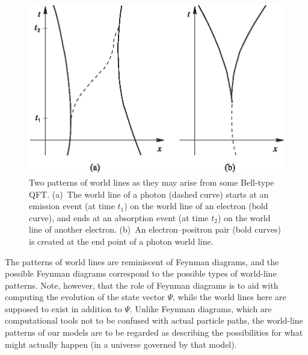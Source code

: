 \documentclass[12pt, showpacs, superscriptaddress]{revtex4-2}%
\begin{document}
\begin{figure}[h]
\begin{center}
\includegraphics[width=.7\linewidth]{crletf1neu.eps}
\end{center}
\caption{Two patterns of world lines as they may arise from some
   Bell-type QFT. (a)~The world line of a photon (dashed curve) starts
   at an emission event (at time $t_1$) on the world line of an
   electron (bold curve), and ends at an absorption event (at time
   $t_2$) on the world line of another electron. (b)~An
   electron--positron pair (bold curves) is created at the end point of
   a photon world line.}
\label{figone}
\end{figure}

The patterns of world lines are reminiscent of Feynman diagrams, and
the possible Feynman diagrams correspond to the possible types of
world-line patterns.  Note, however, that the role of Feynman diagrams
is to aid with computing the evolution of the state vector $\Psi$,
while the world lines here are supposed to exist in addition to
$\Psi$.  Unlike Feynman diagrams, which are computational tools not to
be confused with actual particle paths, the world-line patterns of our
models are to be regarded as describing the possibilities for what
might actually happen (in a universe governed by that model).
\end{document}
